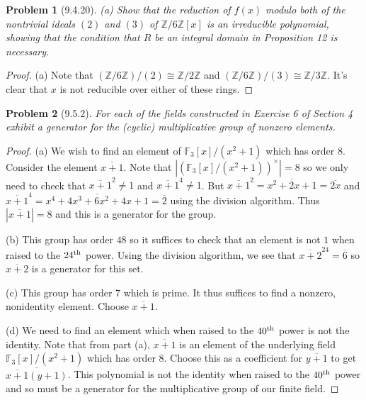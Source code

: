\documentclass{article}
\newtheorem{problem}{Problem}
\begin{document}
\begin{problem}[9.4.20]
(a) Show that the reduction of $f(x)$ modulo both of the nontrivial ideals $(2)$ and $(3)$ of $\mathbb{Z}/6\mathbb{Z}[x]$ is an irreducible polynomial, showing that the condition that $R$ be an integral domain in Proposition 12 is necessary.
\end{problem}
\begin{proof}
(a) Note that $(\mathbb{Z}/6\mathbb{Z})/(2) \cong \mathbb{Z}/2\mathbb{Z}$ and $(\mathbb{Z}/6\mathbb{Z})/(3) \cong \mathbb{Z}/3\mathbb{Z}$. It's clear that $x$ is not reducible over either of these rings.
\end{proof}

\begin{problem}[9.5.2]
For each of the fields constructed in Exercise 6 of Section 4 exhibit a generator for the (cyclic) multiplicative group of nonzero elements.
\end{problem}
\begin{proof}
(a) We wish to find an element of $\mathbb{F}_3[x]/(x^2+1)$ which has order $8$. Consider the element $\overline{x+1}$. Note that $|(\mathbb{F}_3[x]/(x^2+1))^{\times}| = 8$ so we only need to check that $\overline{x+1}^2 \neq 1$ and $\overline{x+1}^4 \neq 1$. But $\overline{x+1}^2 = \overline{x^2 + 2x + 1} = \overline{2x}$ and $\overline{x+1}^4 = \overline{x^4 + 4x^3 + 6x^2 + 4x + 1} = \overline{2}$ using the division algorithm. Thus $|\overline{x+1}| = 8$ and this is a generator for the group.

(b) This group has order $48$ so it suffices to check that an element is not $1$ when raised to the $24^{\textup{th}}$ power. Using the division algorithm, we see that $\overline{x+2}^24 = \overline{6}$ so $\overline{x+2}$ is a generator for this set.

(c) This group has order $7$ which is prime. It thus suffices to find a nonzero, nonidentity element. Choose $\overline{x+1}$.

(d) We need to find an element which when raised to the $40^{\textup{th}}$ power is not the identity. Note that from part (a), $\overline{x+1}$ is an element of the underlying field $\mathbb{F}_3[x]/(x^2+1)$ which has order $8$. Choose this as a coefficient for $\overline{y+1}$ to get $\overline{\overline{x+1}(y+1)}$. This polynomial is not the identity when raised to the $40^{\textup{th}}$ power and so must be a generator for the multiplicative group of our finite field.
\end{proof}
\end{document}
